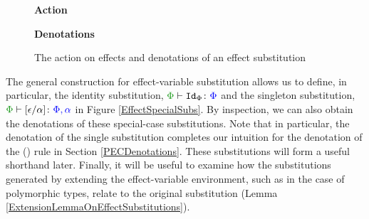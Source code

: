 \documentclass{Report}
\begin{document}
\begin{figure}[H]
    \centering
    \begin{minipage}{0.47\textwidth}
      \begin{framed}
        \centering
        \textbf{Action}
  
      \end{framed}
    \end{minipage}
    \quad
    \begin{minipage}{0.47\textwidth}
      \begin{framed}
        \centering
        \textbf{Denotations}
  
      \end{framed}
    \end{minipage}
    \caption{The action on effects and denotations of an effect substitution}
    \label{EffectSubstitutionActionEffects}
\end{figure}

The general construction for effect-variable substitution allows us to define, in particular, the identity substitution, $\typerelation{\P}{\Id{\P}}{\P}$ and the singleton substitution, $\typerelation{\P}{\ssub{\a}{\e}}{\P,\a}$ in Figure \ref{EffectSpecialSubs}. By inspection, we can also obtain the denotations of these special-case substitutions. Note that in particular, the denotation of the single substitution completes our intuition for the denotation of the (\textit{\vspec}) rule in Section \ref{PECDenotations}. These substitutions will form a useful shorthand later. Finally, it will be useful to examine how the substitutions generated by extending the effect-variable environment, such as in the case of polymorphic types, relate to the original substitution (Lemma \ref{ExtensionLemmaOnEffectSubstitutions}).
\end{document}
